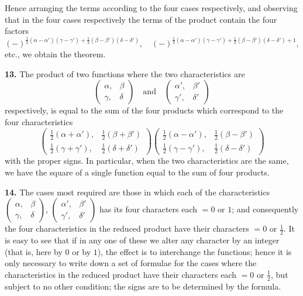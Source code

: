 \documentclass[11pt,a4paper]{book}
\begin{document}
Hence arranging the terms according to the four cases respectively, and observing that in the four cases respectively the terms of the product contain the four factors
\[
(-)^{\frac{1}{2}(\alpha - \alpha')(\gamma - \gamma') + \frac{1}{2}(\beta - \beta')(\delta - \delta')},\quad
(-)^{\frac{1}{2}(\alpha - \alpha')(\gamma - \gamma') + \frac{1}{2}(\beta - \beta')(\delta - \delta') + 1},
\]
etc., we obtain the theorem.

\noindent\textbf{13.}\quad
The product of two functions where the two characteristics are
\[
\begin{pmatrix} \alpha, & \beta \\ \gamma, & \delta \end{pmatrix}\quad \text{and}\quad
\begin{pmatrix} \alpha', & \beta' \\ \gamma', & \delta' \end{pmatrix}
\]
respectively, is equal to the sum of the four products which correspond to the four characteristics
\[
\begin{pmatrix} \tfrac{1}{2}(\alpha + \alpha'), & \tfrac{1}{2}(\beta + \beta') \\ \tfrac{1}{2}(\gamma + \gamma'), & \tfrac{1}{2}(\delta + \delta') \end{pmatrix}
\begin{pmatrix} \tfrac{1}{2}(\alpha - \alpha'), & \tfrac{1}{2}(\beta - \beta') \\ \tfrac{1}{2}(\gamma - \gamma'), & \tfrac{1}{2}(\delta - \delta') \end{pmatrix}
\]
with the proper signs. In particular, when the two characteristics are the same, we have the square of a single function equal to the sum of four products.

\noindent\textbf{14.}\quad
The cases most required are those in which each of the characteristics $\begin{pmatrix} \alpha, & \beta \\ \gamma, & \delta \end{pmatrix}$, $\begin{pmatrix} \alpha', & \beta' \\ \gamma', & \delta' \end{pmatrix}$ has its four characters each $= 0$ or $1$; and consequently the four characteristics in the reduced product have their characters $= 0$ or $\tfrac{1}{2}$. It is easy to see that if in any one of these we alter any character by an integer (that is, here by $0$ or by $1$), the effect is to interchange the functions; hence it is only necessary to write down a set of formulae for the cases where the characteristics in the reduced product have their characters each $= 0$ or $\tfrac{1}{2}$, but subject to no other condition; the signs are to be determined by the formula.
\end{document}

